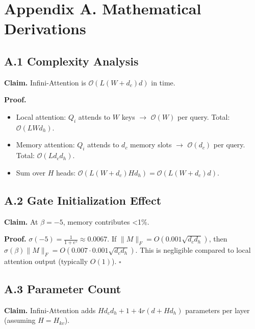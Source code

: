 
\section{Appendix A. Mathematical Derivations}

\subsection{A.1 Complexity Analysis}

\textbf{Claim.} Infini-Attention is $\mathcal{O}(L(W + d_c) d)$ in time.

\textbf{Proof.} 
\begin{itemize}
\item Local attention: $Q_i$ attends to $W$ keys $\to$ $\mathcal{O}(W)$ per query.
  Total: $\mathcal{O}(L W d_h)$.
\item Memory attention: $Q_i$ attends to $d_c$ memory slots $\to$ $\mathcal{O}(d_c)$
  per query. Total: $\mathcal{O}(L d_c d_h)$.
\item Sum over $H$ heads: $\mathcal{O}(L(W + d_c) H d_h) = \mathcal{O}(L(W + d_c) d)$.

\end{itemize}
\subsection{A.2 Gate Initialization Effect}

\textbf{Claim.} At $\beta = -5$, memory contributes \textless{}1\%.

\textbf{Proof.} $\sigma(-5) = \frac{1}{1 + e^5} \approx 0.0067$. If $\|M\|_F = O(0.001 \sqrt{d_c d_h})$, 
then $\sigma(\beta) \|M\|_F = O(0.007 \cdot 0.001 \sqrt{d_c d_h})$. This is 
negligible compared to local attention output (typically $O(1)$). $\square$

\subsection{A.3 Parameter Count}

\textbf{Claim.} Infini-Attention adds $H d_c d_h + 1 + 4 r(d + H d_h)$ parameters 
per layer (assuming $H = H_{kv}$).


